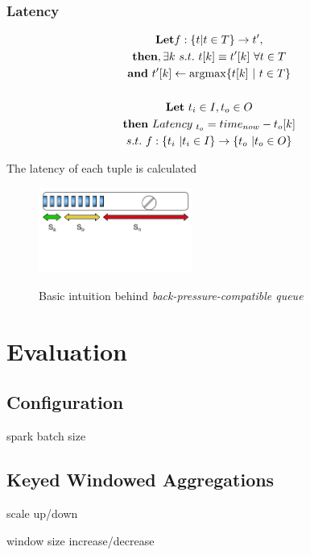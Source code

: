 \documentclass{vldb}
\begin{document}
\subsubsection{Latency}

\begin{equation}
  \begin{gathered}
\textbf{Let} f:\{t| t\in T \} \to t'  , \\
  \textbf{then}, \exists k \ s.t. \ t[k]  \equiv t'[k] \ \forall t \in T\\
  \textbf{and} \ t'[k] \gets \argmax\{t[k] \ | \ t \in T\}  \\
   \\
  \textbf{Let} \ t_{i} \in I , t_{o} \in O \\
\textbf{then} \ Latency_{ \ t_{o}} = time_{now} -  t_{o}[k] \\
s.t. \ f:\{t_{i} \ | t_{i} \in I \} \to \{t_{o} \ | t_{o} \in O \} 
  \end{gathered}\label{eq_1} 
\end{equation}

The latency of each tuple is calculated


\begin{figure}[h]
\caption{Basic intuition behind \textit{back-pressure-compatible queue}}
\centering
\includegraphics[width=0.45\textwidth]{queue}
\label{fig_queue}
\end{figure}


\section{Evaluation}
\subsection{Configuration}
spark batch size

\subsection{Keyed Windowed Aggregations}
scale up/down

window size increase/decrease
\end{document}
